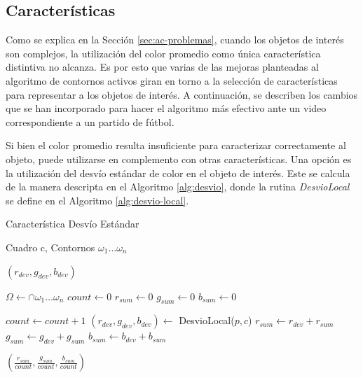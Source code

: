 \subsection{Características}
\label{sec:caracteristicas}

Como se explica en la Sección \ref{sec:ac-problemas}, cuando los objetos de
interés son complejos, la utilización del color promedio como única
característica distintiva no alcanza. Es por esto que varias de las mejoras
planteadas al algoritmo de contornos activos giran en torno a la selección de
características para representar a los objetos de interés. A continuación, se
describen los cambios que se han incorporado para hacer el algoritmo más
efectivo ante un video correspondiente a un partido de fútbol.

Si bien el color promedio resulta insuficiente para caracterizar correctamente
al objeto, puede utilizarse en complemento con otras características. Una opción
es la utilización del desvío estándar de color en el objeto de interés.
Este se calcula de la manera descripta en el Algoritmo \ref{alg:desvio},
donde la rutina \textit{DesvioLocal} se define en el Algoritmo \ref{alg:desvio-local}.

\begin{algorithm}
    \caption{Característica Desvío Estándar}
    \label{alg:desvio}
    \begin{algorithmic}
    \Require\hspace{\algorithmicindent}\hspace{\algorithmicindent}Cuadro c, Contornos $\omega_1 \dots \omega_n$

    \Ensure\hspace{\algorithmicindent}\hspace{0.23cm} $(r_{dev}, g_{dev}, b_{dev})$
    \State

    \State $\Omega \gets \cap \omega_1 \dots \omega_n$
    \State $count \gets 0$
    \State $r_{sum} \gets 0$
    \State $g_{sum} \gets 0$
    \State $b_{sum} \gets 0$

            \State $count \gets count + 1$
            \State $(r_{dev}, g_{dev}, b_{dev}) \gets $ DesvioLocal($p, c$)
            \State $r_{sum} \gets r_{dev} + r_{sum}$
            \State $g_{sum} \gets g_{dev} + g_{sum}$
            \State $b_{sum} \gets b_{dev} + b_{sum}$
        \EndIf
    \EndFor

    \State \Return $ (\frac{r_{sum}}{count}, \frac{g_{sum}}{count}, \frac{b_{sum}}{count}) $
    \end{algorithmic}
\end{algorithm}

